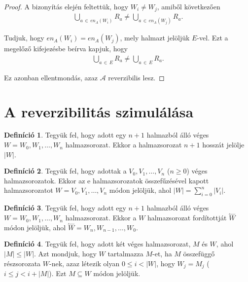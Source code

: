 \documentclass[12pt]{article}
\theoremstyle{definition}
\newtheorem*{definition*}{Definíció}
\theoremstyle{remark}
\theoremstyle{plain}
\theoremstyle{plain}
\newcommand{\backwardhat}{\overset{\leftharpoonup}}
\newcommand{\en}{\textit{en}}
\begin{document}
\begin{proof}
        A bizonyítás elején feltettük, hogy $W_{i} \neq W_{j}$, amiből következően
        \begin{align*}
            \bigcup\limits_{a \,\in\, \en_{A}(W_{i})} R_{a} \neq \bigcup\limits_{a \,\in\, \en_{A}(W_{j})} R_{a}.
        \end{align*}

        Tudjuk, hogy $\en_{A}(W_{i}) = \en_{A}(W_{j})$, mely halmazt jelöljük $E$-vel. Ezt a megelőző kifejezésbe beírva kapjuk, hogy
        \begin{align*}
            \bigcup\limits_{a \,\in\, E} R_{a} \neq \bigcup\limits_{a \,\in\, E} R_{a}.
        \end{align*}
        
        Ez azonban ellentmondás, azaz $\mathscr{A}$ reverzibilis lesz.
    \end{proof}

    \section*{A reverzibilitás szimulálása}

    \begin{definition*}
        Tegyük fel, hogy adott egy $n + 1$ halmazból álló véges $W=W_{0}, W_{1}, \ldots, W_{n}$ halmazsorozat. Ekkor a halmazsorozat $n + 1$ hosszát jelölje $|W|$.
    \end{definition*}

    \begin{definition*}
        Tegyük fel, hogy adottak a $V_{0}, V_{1}, \ldots, V_{n}$ ($n \geq 0$) véges halmazsorozatok. Ekkor az e halmazsorozatok összefűzésével kapott halmazsorozatot $W = V_{0}, V_{1}, \ldots, V_{n}$ módon jelöljük, ahol $|W| = \sum_{i = 0}^{n}|V_{i}|$.
    \end{definition*}

    \begin{definition*}
        Tegyük fel, hogy adott egy $n + 1$ halmazból álló véges $W=W_{0}, W_{1}, \ldots, W_{n}$ halmazsorozat. Ekkor a $W$ halmazsorozat fordítottját $\backwardhat W$ módon jelöljük, ahol $\backwardhat W = W_{n}, W_{n - 1}, \ldots, W_{0}$.
    \end{definition*}

    \begin{definition*}
        Tegyük fel, hogy adott két véges halmazsorozat, $M$ és $W$, ahol $|M| \leq |W|$. Azt mondjuk, hogy $W$ tartalmazza $M$-et, ha $M$ összefüggő részsorozata $W$-nek, azaz létezik olyan $0 \leq i < |W|$, hogy $W_{j} = M_{j}$ ($i \leq j < i + |M|$). Ezt $M \subseteq W$ módon jelöljük.
    \end{definition*}
\end{document}
